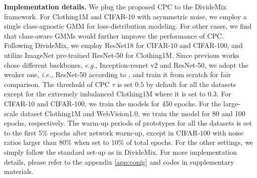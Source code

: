 \documentclass{article} \usepackage{iclr2023_conference,times}
\begin{document}
\textbf{Implementation details.} We plug the proposed CPC to the DivideMix \citep{Li2020DivideMixLW} framework. For Clothing1M and CIFAR-10 with asymmetric noise, we employ a single class-agnostic GMM for loss-distribution modeling. For other cases, we find that  class-aware GMMs would further improve the performance of CPC. Following DivideMix, we employ ResNet18 \citep{he2016identity} for CIFAR-10 and CIFAR-100, and utilize ImageNet pre-trained ResNet-50 for Clothing1M. Since previous works chose different backbones, \emph{e.g.}, Inception-resnet v2 \citep{szegedy2017inception} and ResNet-50, we adopt the weaker one, \emph{i.e.,} ResNet-50 according to \citep{DBLP:journals/corr/abs-2103-13646}, and train it from scratch for fair comparison. The threshold of CPC $\tau$ is set $0.5$ by default for all the datasets except for the extremely imbalanced Clothing1M where it is set to $0.3$. For CIFAR-10 and CIFAR-100, we train the models for 450 epochs. For the large-scale dataset Clothing1M and WebVision1.0, we train the model for 80 and 100 epochs, respectively. The warm-up periods of prototypes for all the datasets is set to the first 5\% epochs after network warm-up, except in CIFAR-100 with noise ratios larger than 80\% when set to 10\% of total epochs. For the other settings, we simply follow the standard set-up as in DivideMix. For more implementation details, please refer to the appendix \ref{app:conig} and codes in supplementary materials.
\end{document}
